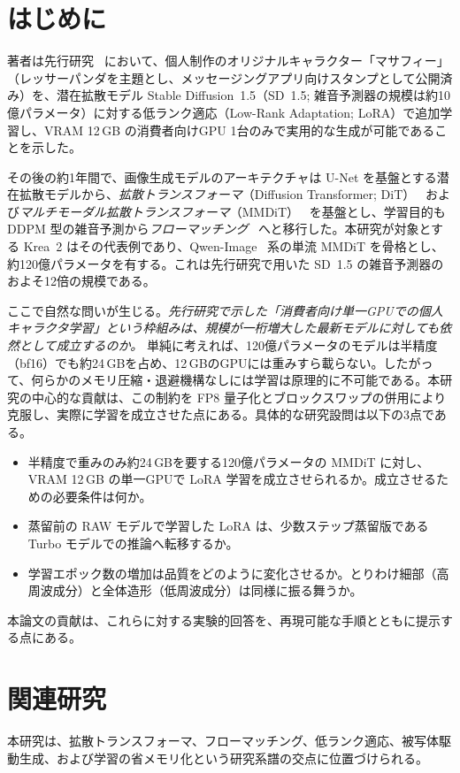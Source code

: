 \documentclass[10pt,twocolumn]{ltjsarticle}
\begin{document}
\section{はじめに}
著者は先行研究~\cite{suzuki2026sd15lora} において、個人制作のオリジナルキャラクター「マサフィー」（レッサーパンダを主題とし、メッセージングアプリ向けスタンプとして公開済み）を、潜在拡散モデル Stable Diffusion~1.5（SD~1.5; 雑音予測器の規模は約10億パラメータ）に対する低ランク適応（Low-Rank Adaptation; LoRA）で追加学習し、VRAM 12\,GB の消費者向けGPU 1台のみで実用的な生成が可能であることを示した。

その後の約1年間で、画像生成モデルのアーキテクチャは U-Net を基盤とする潜在拡散モデルから、\emph{拡散トランスフォーマ}（Diffusion Transformer; DiT）~\cite{peebles2023dit} および\emph{マルチモーダル拡散トランスフォーマ}（MMDiT）~\cite{esser2024sd3} を基盤とし、学習目的も DDPM 型の雑音予測から\emph{フローマッチング}~\cite{lipman2023flowmatching} へと移行した。本研究が対象とする Krea~2 はその代表例であり、Qwen-Image~\cite{qwenimage2025} 系の単流 MMDiT を骨格とし、約120億パラメータを有する。これは先行研究で用いた SD~1.5 の雑音予測器のおよそ12倍の規模である。

ここで自然な問いが生じる。\emph{先行研究で示した「消費者向け単一GPUでの個人キャラクタ学習」という枠組みは、規模が一桁増大した最新モデルに対しても依然として成立するのか。} 単純に考えれば、120億パラメータのモデルは半精度（bf16）でも約24\,GBを占め、12\,GBのGPUには重みすら載らない。したがって、何らかのメモリ圧縮・退避機構なしには学習は原理的に不可能である。本研究の中心的な貢献は、この制約を FP8 量子化とブロックスワップの併用により克服し、実際に学習を成立させた点にある。具体的な研究設問は以下の3点である。
\begin{itemize}[leftmargin=2.2em,topsep=2pt,itemsep=1pt]
  \item[\textbf{Q1.}] 半精度で重みのみ約24\,GBを要する120億パラメータの MMDiT に対し、VRAM 12\,GB の単一GPUで LoRA 学習を成立させられるか。成立させるための必要条件は何か。
  \item[\textbf{Q2.}] 蒸留前の RAW モデルで学習した LoRA は、少数ステップ蒸留版である Turbo モデルでの推論へ転移するか。
  \item[\textbf{Q3.}] 学習エポック数の増加は品質をどのように変化させるか。とりわけ細部（高周波成分）と全体造形（低周波成分）は同様に振る舞うか。
\end{itemize}
本論文の貢献は、これらに対する実験的回答を、再現可能な手順とともに提示する点にある。

\section{関連研究}
本研究は、拡散トランスフォーマ、フローマッチング、低ランク適応、被写体駆動生成、および学習の省メモリ化という研究系譜の交点に位置づけられる。
\end{document}
